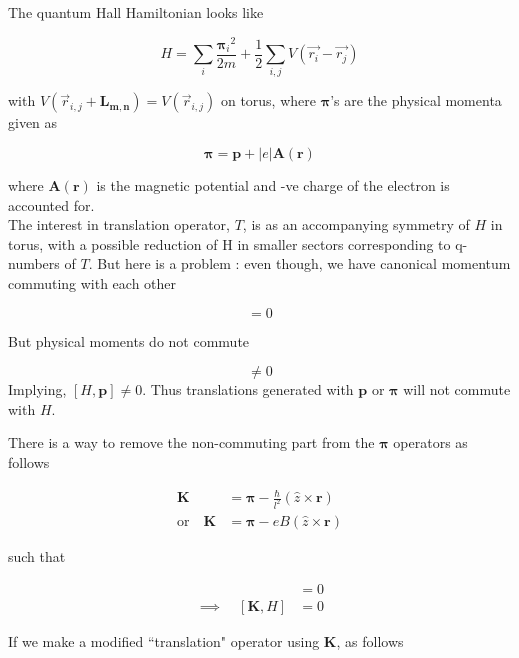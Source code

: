 \documentclass[11pt,a4paper,notitlepage]{article}
\newcommand{\bsym}{\boldsymbol}
\newcommand{\non}{\nonumber}
\begin{document}
  		The quantum Hall Hamiltonian looks like 

		\begin{equation}
			H = \sum_{i}\frac{{\bsym{\pi}_{i}}^{2}}{2m}  + \frac{1}{2}\sum_{i,j} V(\vec{r_i}-\vec{r_j})
		\end{equation}
		
		with $V(\vec{r}_{i,j} + \boldsymbol{L_{m,n}})=V(\vec{r}_{i,j})$ on torus, where $\bsym{\pi}$'s are the 
		physical momenta given as 
		
		\begin{equation*}
			\bsym{\pi} = \bsym{p} + |e|\bsym{A}(\bsym{r})
		\end{equation*}
		
		where $\bsym{A}(\bsym{r})$ is the magnetic potential and -ve charge of the electron is accounted for.\\
		
		The interest in translation operator, $T$, is as an accompanying symmetry of $H$ in torus, with a possible 
		reduction of H in smaller sectors corresponding to q-numbers of $T$. But here is a problem : even though, 
		we have canonical momentum commuting with each other
		
		\begin{equation*}
			[p_x,p_y] = 0
		\end{equation*}
		
		But physical moments do not commute
		
		\begin{equation*}
			[\pi_x,\pi_y] \neq 0
		\end{equation*}
		Implying, $[H,\bsym{p}]\neq 0$. Thus translations generated with $\bsym{p}$ or $\bsym{\pi}$ will not 
		commute with $H$.
		
		There is a way to remove the non-commuting part from the $\bsym{\pi}$ operators as follows
		
		\begin{align}
			\bsym{K} &= \bsym{\pi} - \frac{\hbar}{l^2}(\hat{z}\times \bsym{r}) \\
			\text{or}\quad \bsym{K} &= \bsym{\pi} - eB(\hat{z}\times \bsym{r}) \non
		\end{align}
		
		such that 
		
		\begin{align*}
			[\bsym{K},\bsym{\pi}]&=0 \\
			\implies\quad [\bsym{K},H]&=0 
		\end{align*}
				
			
		If we make a modified ``translation" operator using $\bsym{K}$, as follows
		
\end{document}
